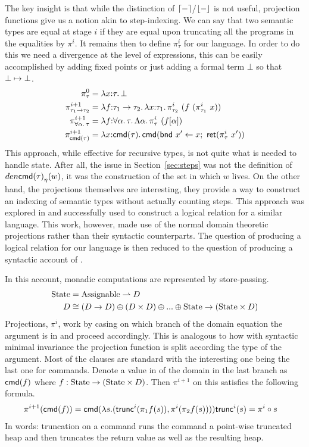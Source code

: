 The key insight is that while the distinction of
$\lceil - \rceil$/$\lfloor - \rfloor$ is not useful, projection functions
give us a notion akin to step-indexing. We can say that two semantic
types are equal at stage $i$ if they are equal upon truncating all the
programs in the equalities by $\pi^i$. It remains then to define
$\pi_\tau^i$ for our language. In order to do this we need a
divergence at the level of expressions, this can be easily
accomplished by adding fixed points or just adding a formal term
$\bot$ so that $\bot \mapsto \bot$.
\begin{align*}
  \pi_\tau^0 &= \lambda x {:} \tau.\, \bot\\
  \pi_{\tau_1 \to \tau_2}^{i + 1} &=
  \lambda f {:} \tau_1 \to \tau_2.\, \lambda x {:} \tau_1.\, \pi_{\tau_2}^i\ (f\ (\pi_{\tau_1}^i\ x))\\
  \pi_{\forall \alpha.\, \tau}^{i + 1} &=
  \lambda f {:} \forall \alpha.\, \tau.\, \Lambda \alpha.\, \pi_\tau^i\ (f[\alpha])\\
  \pi_{\mathsf{cmd}(\tau)}^{i + 1} &=
  \lambda x {:} \mathsf{cmd}(\tau).\, \mathsf{cmd}(\mathsf{bnd}\ x' \gets x;\ \mathsf{ret}(\pi_\tau^i\ x'))
\end{align*}
This approach, while effective for recursive types, is not quite what
is needed to handle state. After all, the issue in
Section~\ref{sec:steps} was not the definition of
$den{\mathsf{cmd}(\tau)}_\eta(w)$, it was the construction of the set in which
$w$ lives. On the other hand, the projections themselves are
interesting, they provide a way to construct an indexing of semantic
types without actually counting steps. This approach was explored in
\citet{Birkedal:domain:10} and successfully used to construct a
logical relation for a similar language. This work, however, made use
of the normal domain theoretic projections rather than their syntactic
counterparts. The question of producing a logical relation for our
language is then reduced to the question of producing a syntactic
account of \citet{Birkedal:domain:10}.

In this account, monadic computations are represented by
store-passing.
\begin{align*}
  \mathrm{State} &= \mathrm{Assignable} \rightharpoonup D\\
  D &\cong (D \to D) \oplus (D \times D) \oplus ... \oplus \mathrm{State} \to (\mathrm{State} \times D)
\end{align*}
Projections, $\pi^i$, work by casing on which branch of the domain
equation the argument is in and proceed accordingly. This is analogous
to how with syntactic minimal invariance the projection function is
split according the type of the argument. Most of the clauses are
standard with the interesting one being the last one for
commands. Denote a value in of the domain in the last branch as
$\mathsf{cmd}(f)$ where $f : \mathrm{State} \to (\mathrm{State} \times D)$. Then
$\pi^{i + 1}$ on this satisfies the following formula.
\begin{align*}
  \pi^{i + 1}(\mathsf{cmd}(f)) &=
  \mathsf{cmd}(\lambda s. (\mathsf{trunc}^i(\pi_1 f(s)), \pi^i(\pi_2 f(s))))
  \mathsf{trunc}^i(s) = \pi^i \circ s
\end{align*}
In words: truncation on a command runs the command a point-wise
truncated heap and then truncates the return value as well as the
resulting heap.

